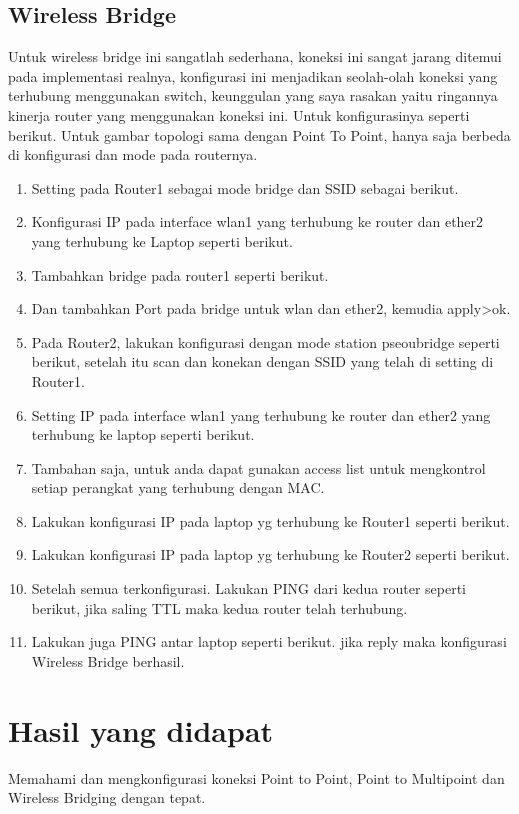 \subsection{Wireless Bridge}
Untuk wireless bridge ini sangatlah sederhana, koneksi ini sangat jarang ditemui pada
implementasi realnya, konfigurasi ini menjadikan seolah-olah koneksi yang terhubung
menggunakan switch, keunggulan yang saya rasakan yaitu ringannya kinerja router yang
menggunakan koneksi ini. Untuk konfigurasinya seperti berikut.
Untuk gambar topologi sama dengan Point To Point, hanya saja berbeda di konfigurasi dan
mode pada routernya.
\begin{center}
	\begin{enumerate}
		\item Setting pada Router1 sebagai mode bridge dan SSID sebagai berikut.
		\item Konfigurasi IP pada interface wlan1 yang terhubung ke router dan ether2 yang terhubung ke Laptop seperti berikut.
		\item Tambahkan bridge pada router1 seperti berikut.
		\item Dan tambahkan Port pada bridge untuk wlan dan ether2, kemudia apply>ok.
		\item Pada Router2, lakukan konfigurasi dengan mode station pseoubridge seperti berikut, setelah itu scan dan konekan dengan SSID yang telah di setting di Router1.
		\item Setting IP pada interface wlan1 yang terhubung ke router dan ether2 yang terhubung ke laptop seperti berikut.
		\item Tambahan saja, untuk anda dapat gunakan access list untuk mengkontrol setiap perangkat yang terhubung dengan MAC.
		\item Lakukan konfigurasi IP pada laptop yg terhubung ke Router1 seperti berikut.
		\item Lakukan konfigurasi IP pada laptop yg terhubung ke Router2 seperti berikut.
		\item Setelah semua terkonfigurasi. Lakukan PING dari kedua router seperti berikut, jika saling TTL maka kedua router telah terhubung.
		\item Lakukan juga PING antar laptop seperti berikut. jika reply maka konfigurasi Wireless Bridge berhasil.
	\end{enumerate}
\end{center}


\section{Hasil yang didapat}
Memahami dan mengkonfigurasi koneksi Point to Point, Point to Multipoint dan Wireless
Bridging dengan tepat.

